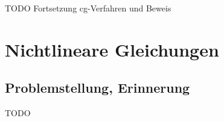 TODO Fortsetzung cg-Verfahren und Beweis

\section{Nichtlineare Gleichungen}

\subsection{Problemstellung, Erinnerung}

TODO

